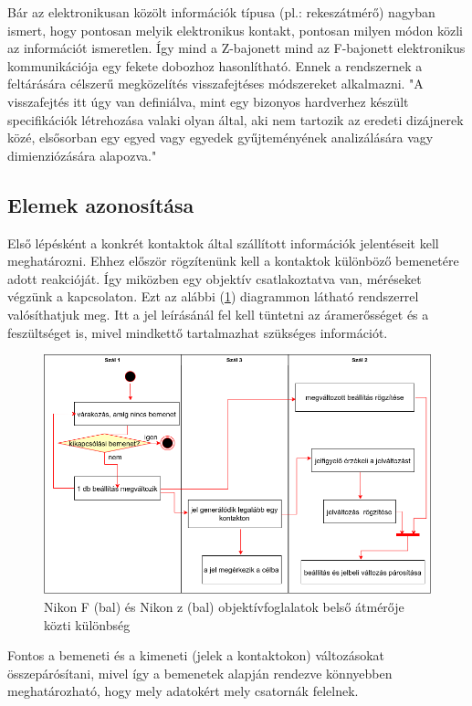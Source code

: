 Bár az elektronikusan közölt információk típusa (pl.: rekeszátmérő) nagyban ismert, hogy pontosan melyik elektronikus kontakt, pontosan milyen módon közli az információt ismeretlen. Így mind a Z-bajonett mind az F-bajonett elektronikus kommunikációja egy fekete dobozhoz hasonlítható. Ennek a rendszernek a feltárására célszerű megközelítés visszafejtéses módszereket alkalmazni. "A visszafejtés itt úgy van definiálva, mint egy bizonyos hardverhez készült specifikációk létrehozása valaki olyan által, aki nem tartozik az eredeti dizájnerek közé, elsősorban egy egyed vagy egyedek gyűjteményének analizálására vagy dimienziózására alapozva."\cite{Reverse_engineering}
\subsection{Elemek azonosítása}
Első lépésként a konkrét kontaktok által szállított információk jelentéseit kell meghatározni. Ehhez először rögzítenünk kell a kontaktok különböző bemenetére adott reakcióját. Így miközben egy objektív csatlakoztatva van, méréseket végzünk a kapcsolaton. Ezt az alábbi (\ref{fig:jelparosito_UML}) diagrammon látható rendszerrel valósíthatjuk meg. Itt a jel leírásánál fel kell tüntetni az áramerősséget és a feszültséget is, mivel mindkettő tartalmazhat szükséges információt.
\begin{figure}[H]
	\centering
	\includegraphics[width=1.0\linewidth]{img/Reverse_2.drawio.png}
	\caption{Nikon F (bal) és Nikon z (bal) objektívfoglalatok belső átmérője közti különbség}
	\label{fig:jelparosito_UML}
\end{figure}
Fontos a bemeneti és a kimeneti (jelek a kontaktokon) változásokat összepárósítani, mivel így a bemenetek alapján rendezve könnyebben meghatározható, hogy mely adatokért mely csatornák felelnek.
